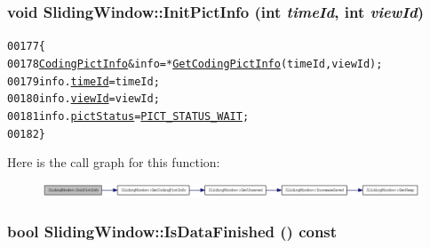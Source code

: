 \hypertarget{class_sliding_window_a012dbfd5902b37d5ce3d37a115d9a96e}{
\subsubsection[{InitPictInfo}]{\setlength{\rightskip}{0pt plus 5cm}void SlidingWindow::InitPictInfo (int {\em timeId}, \/  int {\em viewId})}}
\label{class_sliding_window_a012dbfd5902b37d5ce3d37a115d9a96e}




\begin{footnotesize}\begin{alltt}
00177         \{
00178                 \hyperlink{struct_coding_pict_info}{CodingPictInfo} &info = *\hyperlink{class_sliding_window_ac50874323a2aaa4ef76fab47f80c9f92}{GetCodingPictInfo}(timeId, viewId);
00179                 info.\hyperlink{struct_coding_pict_info_ad85dae4751165ea3cbb8f7b8c6e61dc3}{timeId} = timeId;
00180                 info.\hyperlink{struct_coding_pict_info_a987595091bfba91b3166b04bca988697}{viewId} = viewId;
00181                 info.\hyperlink{struct_coding_pict_info_a41498e5ba764405481005e6569d7f728}{pictStatus} = \hyperlink{_picture_info_8h_ac2f16d038f94c6c57ed8648c6cfe3bb7}{PICT_STATUS_WAIT};
00182         \}
\end{alltt}\end{footnotesize}




Here is the call graph for this function:\nopagebreak
\begin{figure}[H]
\begin{center}
\leavevmode
\includegraphics[width=420pt]{class_sliding_window_a012dbfd5902b37d5ce3d37a115d9a96e_cgraph}
\end{center}
\end{figure}


\hypertarget{class_sliding_window_afd67521d283b68f9fbc769ee9c0ba4b4}{
\subsubsection[{IsDataFinished}]{\setlength{\rightskip}{0pt plus 5cm}bool SlidingWindow::IsDataFinished () const}}
\label{class_sliding_window_afd67521d283b68f9fbc769ee9c0ba4b4}




